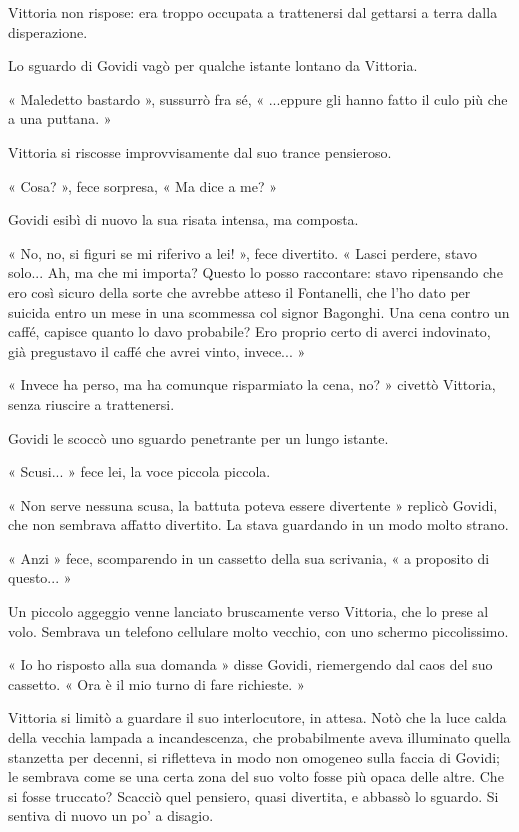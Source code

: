 Vittoria non rispose: era troppo occupata a trattenersi dal gettarsi a terra dalla disperazione.

Lo sguardo di Govidi vagò per qualche istante lontano da Vittoria.

« Maledetto bastardo », sussurrò fra sé, « ...eppure gli hanno fatto il culo più che a una puttana. »

Vittoria si riscosse improvvisamente dal suo trance pensieroso.

« Cosa? », fece sorpresa, « Ma dice a me? »

Govidi esibì di nuovo la sua risata intensa, ma composta.

« No, no, si figuri se mi riferivo a lei! », fece divertito. « Lasci perdere, stavo solo... Ah, ma che mi importa? Questo lo posso raccontare: stavo ripensando che ero così sicuro della sorte che avrebbe atteso il Fontanelli, che l'ho dato per suicida entro un mese in una scommessa col signor Bagonghi. Una cena contro un caffé, capisce quanto lo davo probabile? Ero proprio certo di averci indovinato, già pregustavo il caffé che avrei vinto, invece... »

« Invece ha perso, ma ha comunque risparmiato la cena, no? » civettò Vittoria, senza riuscire a trattenersi.

Govidi le scoccò uno sguardo penetrante per un lungo istante.

« Scusi... » fece lei, la voce piccola piccola.

« Non serve nessuna scusa, la battuta poteva essere divertente » replicò Govidi, che non sembrava affatto divertito. La stava guardando in un modo molto strano.

« Anzi » fece, scomparendo in un cassetto della sua scrivania, « a proposito di questo... »

Un piccolo aggeggio venne lanciato bruscamente verso Vittoria, che lo prese al volo. Sembrava un telefono cellulare molto vecchio, con uno schermo piccolissimo.

« Io ho risposto alla sua domanda » disse Govidi, riemergendo dal caos del suo cassetto. « Ora è il mio turno di fare richieste. »

Vittoria si limitò a guardare il suo interlocutore, in attesa. Notò che la luce calda della vecchia lampada a incandescenza, che probabilmente aveva illuminato quella stanzetta per decenni, si rifletteva in modo non omogeneo sulla faccia di Govidi; le sembrava come se una certa zona del suo volto fosse più opaca delle altre. Che si fosse truccato? Scacciò quel pensiero, quasi divertita, e abbassò lo sguardo. Si sentiva di nuovo un po' a disagio.

